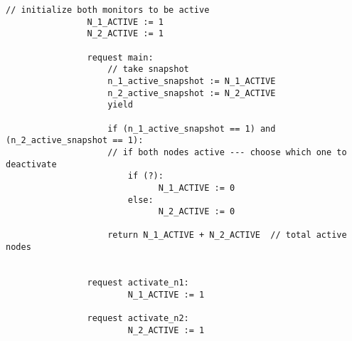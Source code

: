 \begin{minipage}[t]{1.0\textwidth}
	\begin{lstlisting}[caption={Snapshot-based monitor deactivation (not serializable)}]
				// initialize both monitors to be active
				N_1_ACTIVE := 1
				N_2_ACTIVE := 1
				
				request main:
					// take snapshot
					n_1_active_snapshot := N_1_ACTIVE
					n_2_active_snapshot := N_2_ACTIVE
					yield
					
					if (n_1_active_snapshot == 1) and (n_2_active_snapshot == 1):
					// if both nodes active --- choose which one to deactivate 
						if (?): 
							  N_1_ACTIVE := 0
						else:
							  N_2_ACTIVE := 0
						
					return N_1_ACTIVE + N_2_ACTIVE  // total active nodes
					
				
				request activate_n1:
					    N_1_ACTIVE := 1
				
				request activate_n2:
					    N_2_ACTIVE := 1
				
				
			\end{lstlisting}
\end{minipage}




%
%
%
%





